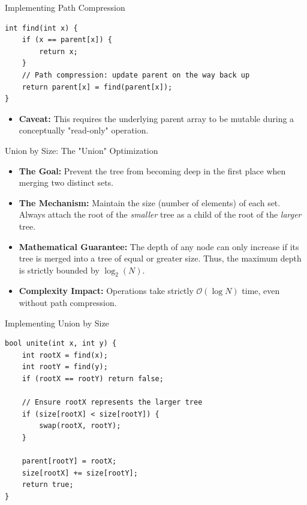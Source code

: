 \documentclass{beamer}
\begin{document}
\begin{frame}[fragile]{Implementing Path Compression}
\begin{verbatim}
int find(int x) {
    if (x == parent[x]) {
        return x;
    }
    // Path compression: update parent on the way back up
    return parent[x] = find(parent[x]); 
}
\end{verbatim}
    \vspace{0.5em}
    \begin{itemize}
        \item \textbf{Caveat:} This requires the underlying parent array to be mutable during a conceptually "read-only" operation.
    \end{itemize}
\end{frame}

\begin{frame}{Union by Size: The "Union" Optimization}
    \begin{itemize}
        \item \textbf{The Goal:} Prevent the tree from becoming deep in the first place when merging two distinct sets.
        \item \textbf{The Mechanism:} Maintain the size (number of elements) of each set. Always attach the root of the \textit{smaller} tree as a child of the root of the \textit{larger} tree.
        \item \textbf{Mathematical Guarantee:} The depth of any node can only increase if its tree is merged into a tree of equal or greater size. Thus, the maximum depth is strictly bounded by $\log_2(N)$.
        \item \textbf{Complexity Impact:} Operations take strictly $\mathcal{O}(\log N)$ time, even without path compression.
    \end{itemize}
\end{frame}

\begin{frame}[fragile]{Implementing Union by Size}
\begin{verbatim}
bool unite(int x, int y) {
    int rootX = find(x);
    int rootY = find(y);
    if (rootX == rootY) return false;
    
    // Ensure rootX represents the larger tree
    if (size[rootX] < size[rootY]) {
        swap(rootX, rootY);
    }
    
    parent[rootY] = rootX;
    size[rootX] += size[rootY];
    return true;
}
\end{verbatim}
\end{frame}
\end{document}
